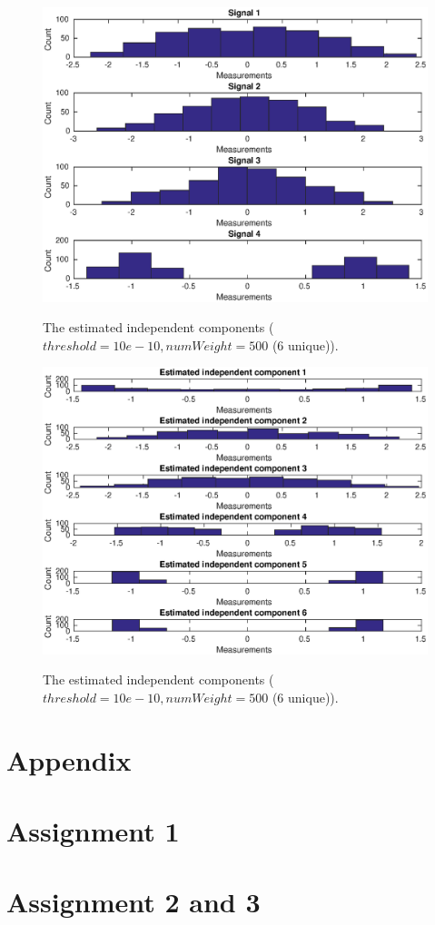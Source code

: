 \documentclass[10pt]{article}
\begin{document}
\begin{figure}
  \centering
  \caption{The estimated independent components ($threshold = 10e-10, numWeight = 500$ (6 unique)).}
    \includegraphics[width=\columnwidth]{Ass3_hist1.eps}
  \label{fig3.3}
\end{figure}
\begin{figure}
  \centering
  \caption{The estimated independent components ($threshold = 10e-10, numWeight = 500$ (6 unique)).}
    \includegraphics[width=\columnwidth]{Ass3_hist2.eps}
  \label{fig3.4}
\end{figure}


\newpage
\section*{Appendix}
\appendix
\section{Assignment 1}
{\label{Ass1}}
\section{Assignment 2 and 3}
{\label{Ass2}}
\end{document}
